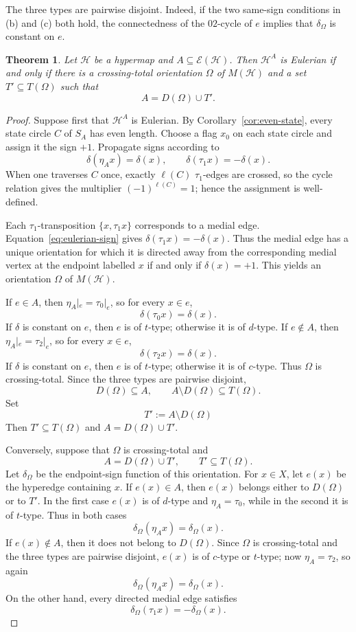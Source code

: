 \documentclass[10pt,a4paper]{article}
\newtheorem{theorem}{Theorem}[section]
\theoremstyle{definition}
\theoremstyle{remark}
\newcommand{\Hcal}{\mathcal{H}}
\newcommand{\Ecal}{\mathcal{E}}
\begin{document}
The three types are pairwise disjoint. Indeed, if the two same-sign conditions in (b) and (c) both hold, the connectedness of the $02$-cycle of $e$ implies that $\delta_\Omega$ is constant on $e$.

\begin{theorem}\label{thm:eulerian}
Let $\Hcal$ be a hypermap and $A\subseteq\Ecal(\Hcal)$. Then $\Hcal^A$ is Eulerian if and only if there is a crossing-total orientation $\Omega$ of $M(\Hcal)$ and a set $T'\subseteq T(\Omega)$ such that
\[
 A=D(\Omega)\cup T'.
\]
\end{theorem}

\begin{proof}
Suppose first that $\Hcal^A$ is Eulerian. By Corollary~\ref{cor:even-state}, every state circle $C$ of $S_A$ has even length. Choose a flag $x_0$ on each state circle and assign it the sign $+1$. Propagate signs according to
\[
  \delta(\eta_Ax)=\delta(x),\qquad
  \delta(\tau_1x)=-\delta(x).
  \tag{E}\label{eq:eulerian-sign}
\]
When one traverses $C$ once, exactly $\ell(C)$ $\tau_1$-edges are crossed, so the cycle relation gives the multiplier $(-1)^{\ell(C)}=1$; hence the assignment is well-defined.

Each $\tau_1$-transposition $\{x,\tau_1x\}$ corresponds to a medial edge. Equation~\eqref{eq:eulerian-sign} gives $\delta(\tau_1x)=-\delta(x)$. Thus the medial edge has a unique orientation for which it is directed away from the corresponding medial vertex at the endpoint labelled $x$ if and only if $\delta(x)=+1$. This yields an orientation $\Omega$ of $M(\Hcal)$.

If $e\in A$, then $\eta_A|_e=\tau_0|_e$, so for every $x\in e$,
\[
  \delta(\tau_0x)=\delta(x).
\]
If $\delta$ is constant on $e$, then $e$ is of $t$-type; otherwise it is of $d$-type. If $e\notin A$, then $\eta_A|_e=\tau_2|_e$, so for every $x\in e$,
\[
  \delta(\tau_2x)=\delta(x).
\]
If $\delta$ is constant on $e$, then $e$ is of $t$-type; otherwise it is of $c$-type. Thus $\Omega$ is crossing-total. Since the three types are pairwise disjoint,
\[
  D(\Omega)\subseteq A,\qquad
  A\setminus D(\Omega)\subseteq T(\Omega).
\]
Set
\[
  T':=A\setminus D(\Omega)
\]
Then $T'\subseteq T(\Omega)$ and $A=D(\Omega)\cup T'$.

Conversely, suppose that $\Omega$ is crossing-total and
\[
  A=D(\Omega)\cup T',\qquad T'\subseteq T(\Omega).
\]
Let $\delta_\Omega$ be the endpoint-sign function of this orientation. For $x\in X$, let $e(x)$ be the hyperedge containing $x$. If $e(x)\in A$, then $e(x)$ belongs either to $D(\Omega)$ or to $T'$. In the first case $e(x)$ is of $d$-type and $\eta_A=\tau_0$, while in the second it is of $t$-type. Thus in both cases
\[
  \delta_\Omega(\eta_Ax)=\delta_\Omega(x).
\]
If $e(x)\notin A$, then it does not belong to $D(\Omega)$. Since $\Omega$ is crossing-total and the three types are pairwise disjoint, $e(x)$ is of $c$-type or $t$-type; now $\eta_A=\tau_2$, so again
\[
  \delta_\Omega(\eta_Ax)=\delta_\Omega(x).
\]
On the other hand, every directed medial edge satisfies
\[
  \delta_\Omega(\tau_1x)=-\delta_\Omega(x).
\]


\end{proof}
\end{document}
